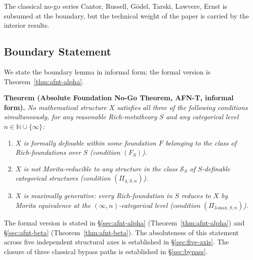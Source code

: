 \documentclass[11pt]{article}
\theoremstyle{plain}
\theoremstyle{definition}
\newcommand{\cS}{\mathcal{S}}
\begin{document}
The classical no-go series Cantor, Russell, G\"odel, Tarski, Lawvere, Ernst is subsumed at the boundary, but the technical weight of the paper is carried by the interior results.

\subsection{Boundary Statement}\label{subsec:afnt-boundary}

We state the boundary lemma in informal form; the formal version is Theorem~\ref{thm:afnt-alpha}.

\begin{framed}
\noindent\textbf{Theorem (Absolute Foundation No-Go Theorem, AFN-T, informal form).}
\emph{No mathematical structure $X$ satisfies all three of the following conditions simultaneously, for any reasonable Rich-metatheory $S$ and any categorical level $n \in \mathbb{N} \cup \{\infty\}$:}
\begin{enumerate}[label=(\arabic*)]
\item \emph{$X$ is formally definable within some foundation $F$ belonging to the class of Rich-foundations over $S$ (condition $(F_S)$).}
\item \emph{$X$ is not Morita-reducible to any structure in the class $\cS_S$ of $S$-definable categorical structures (condition $(\Pi_{4, S, n})$).}
\item \emph{$X$ is maximally generative: every Rich-foundation in $S$ reduces to $X$ by Morita equivalence at the $(\infty, n)$-categorical level (condition $(\Pi_{3\text{-max}, S, n})$).}
\end{enumerate}
\end{framed}

The formal version is stated in \S\ref{sec:afnt-alpha} (Theorem~\ref{thm:afnt-alpha}) and \S\ref{sec:afnt-beta} (Theorem~\ref{thm:afnt-beta}). The absoluteness of this statement across five independent structural axes is established in \S\ref{sec:five-axis}. The closure of three classical bypass paths is established in \S\ref{sec:bypass}.
\end{document}

